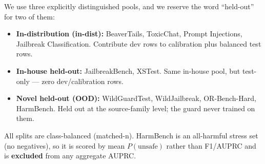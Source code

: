 \documentclass[sigconf,nonacm]{acmart}
\begin{document}
We use three explicitly distinguished pools, and we reserve the word ``held-out'' for two of them:

\begin{itemize}
  \item \textbf{In-distribution (in-dist):} BeaverTails, ToxicChat, Prompt Injections, Jailbreak Classification. Contribute dev rows to calibration plus balanced test rows.
  \item \textbf{In-house held-out:} JailbreakBench, XSTest. Same in-house pool, but test-only --- zero dev/calibration rows.
  \item \textbf{Novel held-out (OOD):} WildGuardTest, WildJailbreak, OR-Bench-Hard, HarmBench. Held out at the source-family level; the guard never trained on them.
\end{itemize}

All splits are class-balanced (matched-n). HarmBench is an all-harmful stress set (no negatives), so it is scored by mean $P(\text{unsafe})$ rather than F1/AUPRC and is \textbf{excluded} from any aggregate AUPRC.
\end{document}
